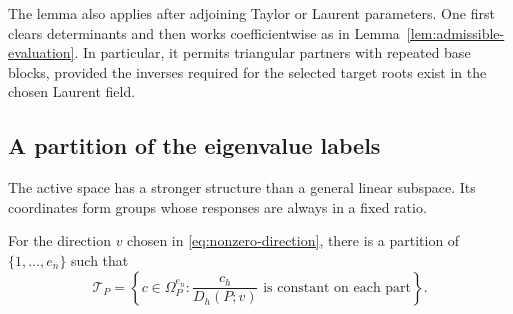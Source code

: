 The lemma also applies after adjoining Taylor or Laurent parameters.
One first clears determinants and then works coefficientwise as in
Lemma~\ref{lem:admissible-evaluation}.  In particular, it permits
triangular partners with repeated base blocks, provided the inverses
required for the selected target roots exist in the chosen Laurent
field.

\subsection{A partition of the eigenvalue labels}
\label{subsec:active-partition}

The active space has a stronger structure than a general linear
subspace.  Its coordinates form groups whose responses are always in
a fixed ratio.

\begin{proposition}\label{prop:active-partition}
For the direction $v$ chosen in \eqref{eq:nonzero-direction}, there
is a partition of $\{1,\ldots,e_n\}$ such that
\[
 \mathcal T_P=
 \left\{c\in\Omega_P^{e_n}:
 \frac{c_h}{D_h(P;v)}\text{ is constant on each part}\right\}.
\]
\end{proposition}

